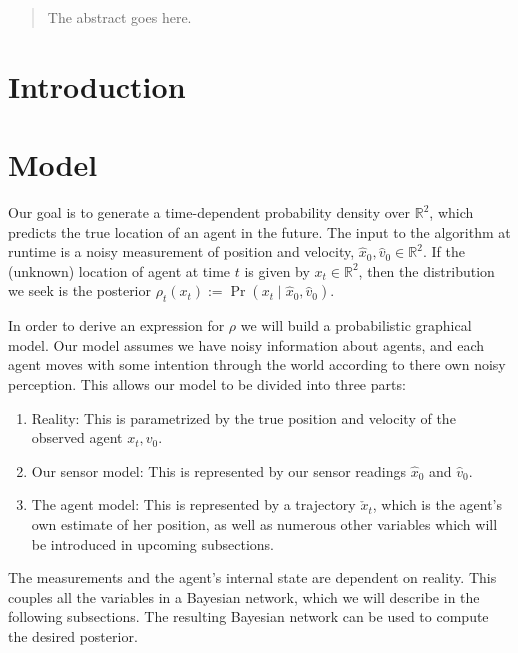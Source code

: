 \documentclass[conference]{IEEEtran}
\begin{document}
\begin{abstract}
The abstract goes here.
\end{abstract}

\IEEEpeerreviewmaketitle

\section{Introduction}

\section{Model}
Our goal is to generate a time-dependent probability density over $\mathbb{R}^2$, which predicts the true location of an agent in the future.
The input to the algorithm at runtime is a noisy measurement of position and velocity, $\hat{x}_0, \hat{v}_0 \in \mathbb{R}^2$.
If the (unknown) location of agent at time $t$ is given by $x_t \in \mathbb{R}^2$, then the distribution we seek is the posterior $\rho_t(x_t) := \Pr( x_t \mid \hat{x}_0, \hat{v}_0 )$.

In order to derive an expression for $\rho$ we will build a probabilistic graphical model.
Our model assumes we have noisy information about agents, and each agent moves with some intention through the world according to there own noisy perception.
This allows our model to be divided into three parts:
\begin{enumerate}
	\item Reality:  This is parametrized by the true position and velocity of the observed agent $x_t, v_0$.
	\item Our sensor model:  This is represented by our sensor readings $\hat{x}_0$ and $\hat{v}_0$.
	\item The agent model:  This is represented by a trajectory $\check{x}_t$, which is the agent's own estimate of her position, as well as numerous other variables which will be introduced in upcoming subsections.
\end{enumerate}

The measurements and the agent's internal state are dependent on reality.  This couples all the variables in a Bayesian network, which we will describe in the following subsections.
The resulting Bayesian network can be used to compute the desired posterior.
\end{document}
